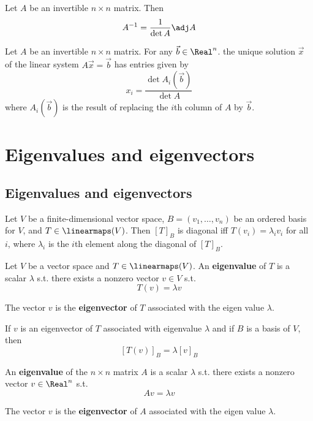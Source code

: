 \begin{lemma}
  Let $A$ be an invertible $n \times n$ matrix. Then
  \[
    A^{-1} = \frac{1}{\det A} \adj A
  \]
\end{lemma}

\begin{theorem}
  Let $A$ be an invertible $n \times n$ matrix. For any $\vec{b} \in \Real^n$. the unique solution $\vec{x}$ of the linear system $A\vec{x} = \vec{b}$ has entries given by
  \[
    x_i = \frac{\det A_i(\vec{b})}{\det A}
  \]
  where $A_i(\vec{b})$ is the result of replacing the $i$th column of $A$ by $\vec{b}$.
\end{theorem}

\section{Eigenvalues and eigenvectors}

\subsection{Eigenvalues and eigenvectors}

\begin{theorem}
  Let $V$ be a finite-dimensional vector space, $B = (v_1, \ldots, v_n)$ be an ordered basis for $V$, and $T \in \linearmaps(V)$. Then $[T]_B$ is diagonal iff $T(v_i) = \lambda_i v_i$ for all $i$, where $\lambda_i$ is the $i$th element along the diagonal of $[T]_B$.
\end{theorem}

\begin{definition}
  Let $V$ be a vector space and $T \in \linearmaps(V)$. An \textbf{eigenvalue} of $T$ is a scalar $\lambda$ s.t. there exists a nonzero vector $v \in V$ s.t.
  \[
    T(v) = \lambda v
  \]

  The vector $v$ is the \textbf{eigenvector} of $T$ associated with the eigen value $\lambda$.
\end{definition}

\begin{lemma}
  If $v$ is an eigenvector of $T$ associated with eigenvalue $\lambda$ and if $B$ is a basis of $V$, then
  \[
    [T(v)]_B = \lambda [v]_B
  \]
\end{lemma}

\begin{definition}
  An \textbf{eigenvalue} of the $n \times n$ matrix $A$ is a scalar $\lambda$ s.t. there exists a nonzero vector $v \in \Real^n$ s.t.
  \[
    Av = \lambda v
  \]

  The vector $v$ is the \textbf{eigenvector} of $A$ associated with the eigen value $\lambda$.
\end{definition}

